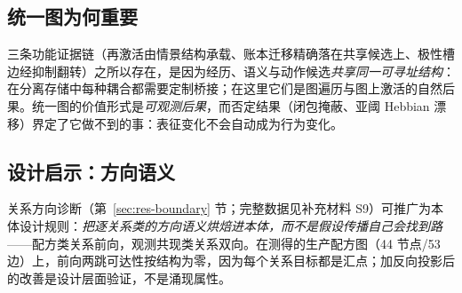 \documentclass[10pt,a4paper]{ctexart}
\begin{document}
\subsection{统一图为何重要}
三条功能证据链（再激活由情景结构承载、账本迁移精确落在共享候选上、极性槽边经抑制翻转）之所以存在，是因为经历、语义与动作候选\emph{共享同一可寻址结构}：在分离存储中每种耦合都需要定制桥接；在这里它们是图遍历与图上激活的自然后果。统一图的价值形式是\emph{可观测后果}，而否定结果（闭包掩蔽、亚阈 Hebbian 漂移）界定了它做不到的事：表征变化不会自动成为行为变化。

\subsection{设计启示：方向语义}
关系方向诊断（第~\ref{sec:res-boundary} 节；完整数据见补充材料 S9）可推广为本体设计规则：\emph{把逐关系类的方向语义烘焙进本体，而不是假设传播自己会找到路}——配方类关系前向，观测共现类关系双向。在测得的生产配方图（44 节点/53 边）上，前向两跳可达性按结构为零，因为每个关系目标都是汇点；加反向投影后的改善是设计层面验证，不是涌现属性。
\end{document}
